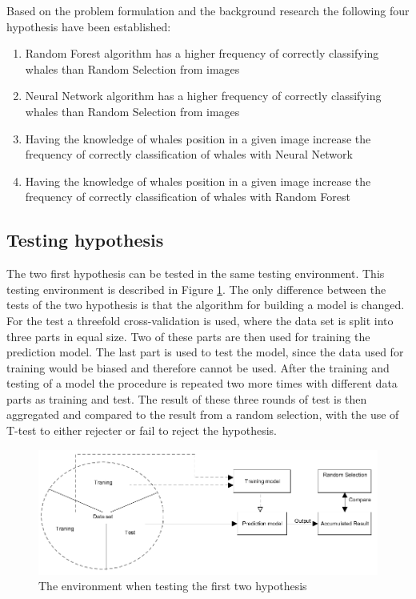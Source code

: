 Based on the problem formulation and the background research the following four hypothesis have been established:
\begin{enumerate}
	\item Random Forest algorithm has a higher frequency of correctly classifying whales than Random Selection from images
	\item Neural Network algorithm has a higher frequency of correctly classifying whales than Random Selection from images
	\item Having the knowledge of whales position in a given image increase the frequency of correctly classification of whales with Neural Network
	\item Having the knowledge of whales position in a given image increase the frequency of correctly classification of whales with Random Forest
\end{enumerate}

\subsection{Testing hypothesis}
The two first hypothesis can be tested in the same testing environment. This testing environment is described in Figure \ref{fig:environmentRaw}. The only difference between the tests of the two hypothesis is that the algorithm for building a model is changed.
For the test a threefold cross-validation is used, where the data set is split into three parts in equal size. Two of these parts are then used for training the prediction model. The last part is used to test the model, since the data used for training would be biased and therefore cannot be used. After the training and testing of a model the procedure is repeated two more times with different data parts as training and test. 
The result of these three rounds of test is then aggregated and compared to the result from a random selection, with the use of T-test to either rejecter or fail to reject the hypothesis.

\begin{figure}
	\centering
	\includegraphics[width=\linewidth]{Images/EnvironmentOnRawData}
	\caption{The environment when testing the first two hypothesis}
	\label{fig:environmentRaw}
\end{figure}

